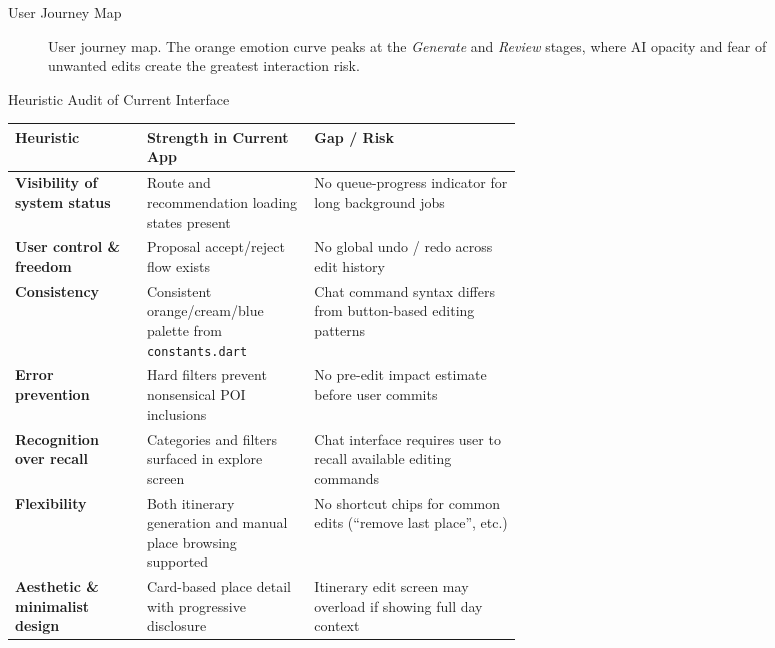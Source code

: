\documentclass[aspectratio=169,professionalfonts]{beamer}
\begin{document}
\begin{frame}{User Journey Map}
\begin{figure}
{}
    \caption{User journey map.  The orange emotion curve peaks at the \emph{Generate} and \emph{Review} stages, where AI opacity and fear of unwanted edits create the greatest interaction risk.}
    \label{fig:journey}
  \end{figure}
\end{frame}

\begin{frame}{Heuristic Audit of Current Interface}
  \begin{table}
    \scriptsize\centering
    \begin{tabularx}{\linewidth}{>{\bfseries}p{0.26\linewidth}
                                  >{\raggedright\arraybackslash}p{0.33\linewidth}
                                  >{\raggedright\arraybackslash}X}
      \toprule
      Heuristic & Strength in Current App & Gap / Risk \\
      \midrule
      Visibility of system status
        & Route and recommendation loading states present
        & No queue-progress indicator for long background jobs \\
      User control \& freedom
        & Proposal accept/reject flow exists
        & No global undo / redo across edit history \\
      Consistency
        & Consistent orange/cream/blue palette from \texttt{constants.dart}
        & Chat command syntax differs from button-based editing patterns \\
      Error prevention
        & Hard filters prevent nonsensical POI inclusions
        & No pre-edit impact estimate before user commits \\
      Recognition over recall
        & Categories and filters surfaced in explore screen
        & Chat interface requires user to recall available editing commands \\
      Flexibility
        & Both itinerary generation and manual place browsing supported
        & No shortcut chips for common edits (``remove last place'', etc.) \\
      Aesthetic \& minimalist design
        & Card-based place detail with progressive disclosure
        & Itinerary edit screen may overload if showing full day context \\
      \bottomrule
    \end{tabularx}
  \end{table}
\end{frame}
\end{document}
